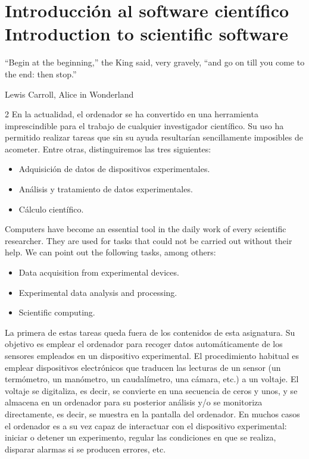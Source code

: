 \chapter{Introducción al software científico\\ Introduction to scientific software}\label{ch1}
\sloppy
\epigraph{``Begin at the beginning,'' the King said, very gravely, ``and go on till you come to the end: then stop.''}{Lewis Carroll, Alice in Wonderland}
\begin{paracol}{2}
En la actualidad, el ordenador se ha convertido en una herramienta imprescindible para el trabajo de cualquier investigador científico. Su uso ha permitido realizar tareas que sin su ayuda resultarían sencillamente imposibles de acometer. Entre otras, distinguiremos las tres siguientes:
\begin{itemize}
\item Adquisición de datos de dispositivos experimentales.
\item Análisis y tratamiento de datos experimentales. 
\item Cálculo científico.
\end{itemize}
\switchcolumn
Computers have become an essential tool in the daily work of every scientific researcher. They are used for tasks that could not be carried out without their help. We can point out the following tasks, among others:
 \begin{itemize}
\item Data acquisition from experimental devices.
\item Experimental data analysis and processing. 
\item Scientific computing.
\end{itemize}

\switchcolumn
La primera de estas tareas queda fuera de los contenidos de esta asignatura. Su objetivo es emplear el ordenador para recoger datos automáticamente de los sensores empleados en un dispositivo experimental. El procedimiento habitual es emplear dispositivos electrónicos que traducen las lecturas de un sensor (un termómetro, un manómetro, un caudalímetro, una cámara, etc.) a un voltaje. El voltaje se digitaliza, es decir, se convierte en una secuencia de ceros y unos, y se almacena en un ordenador para su posterior análisis y/o se monitoriza directamente, es decir, se muestra en la pantalla del ordenador. En muchos casos el ordenador es a su vez capaz de interactuar con el dispositivo experimental: iniciar o detener un experimento, regular las condiciones en que se realiza, disparar alarmas si se producen errores, etc.


\end{paracol}
